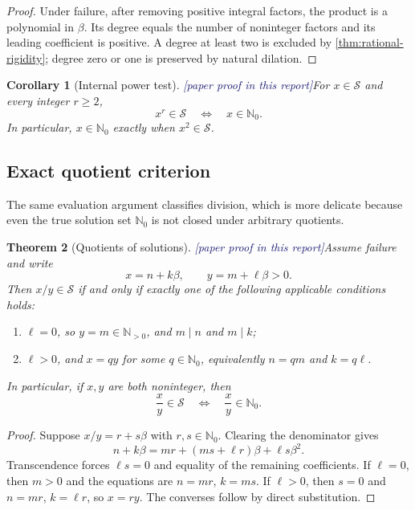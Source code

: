 \documentclass[11pt,oneside]{article}
\newtheorem{theorem}{Theorem}[section]
\newtheorem{corollary}[theorem]{Corollary}
\theoremstyle{definition}
\newcommand{\N}{\mathbb N}
\newcommand{\Nzero}{\mathbb N_0}
\newcommand{\Sol}{\mathcal S}
\newcommand{\tagPaper}{\textcolor{MidnightBlue}{\textsf{[paper proof in this report]}}}
\begin{document}
\begin{proof}
Under failure, after removing positive integral factors, the product is a polynomial in
\(\beta\).  Its degree equals the number of noninteger factors and its leading coefficient
is positive.  A degree at least two is excluded by
\cref{thm:rational-rigidity}; degree zero or one is preserved by natural dilation.
\end{proof}

\begin{corollary}[Internal power test]\label{cor:power-test}
\tagPaper For \(x\in\Sol\) and every integer \(r\ge2\),
\[
  x^r\in\Sol\quad\Longleftrightarrow\quad x\in\Nzero.
\]
In particular, \(x\in\Nzero\) exactly when \(x^2\in\Sol\).
\end{corollary}

\subsection{Exact quotient criterion}

The same evaluation argument classifies division, which is more delicate because even the
true solution set \(\Nzero\) is not closed under arbitrary quotients.

\begin{theorem}[Quotients of solutions]\label{thm:quotient-criterion}
\tagPaper Assume failure and write
\[
  x=n+k\beta,\qquad y=m+\ell\beta>0.
\]
Then \(x/y\in\Sol\) if and only if exactly one of the following applicable conditions
holds:
\begin{enumerate}[label=\textup{(\alph*)}]
\item \(\ell=0\), so \(y=m\in\N_{>0}\), and \(m\mid n\) and \(m\mid k\);
\item \(\ell>0\), and \(x=qy\) for some \(q\in\Nzero\), equivalently
\(n=qm\) and \(k=q\ell\).
\end{enumerate}
In particular, if \(x,y\) are both noninteger, then
\[
  \frac{x}{y}\in\Sol
  \quad\Longleftrightarrow\quad
  \frac{x}{y}\in\Nzero.
\]
\end{theorem}

\begin{proof}
Suppose \(x/y=r+s\beta\) with \(r,s\in\Nzero\).  Clearing the denominator gives
\[
  n+k\beta
  =mr+(ms+\ell r)\beta+\ell s\beta^2.
\]
Transcendence forces \(\ell s=0\) and equality of the remaining coefficients.
If \(\ell=0\), then \(m>0\) and the equations are \(n=mr\), \(k=ms\).
If \(\ell>0\), then \(s=0\) and \(n=mr\), \(k=\ell r\), so \(x=ry\).
The converses follow by direct substitution.
\end{proof}
\end{document}
